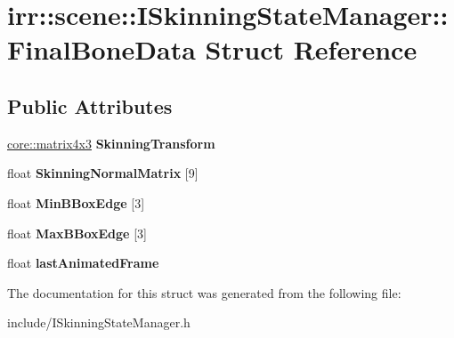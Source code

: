\hypertarget{structirr_1_1scene_1_1ISkinningStateManager_1_1FinalBoneData}{}\section{irr\+:\+:scene\+:\+:I\+Skinning\+State\+Manager\+:\+:Final\+Bone\+Data Struct Reference}
\label{structirr_1_1scene_1_1ISkinningStateManager_1_1FinalBoneData}
\subsection*{Public Attributes}
\begin{DoxyCompactItemize}
\item 
\hyperlink{classirr_1_1core_1_1matrix4x3}{core\+::matrix4x3} {\bfseries Skinning\+Transform}\hypertarget{structirr_1_1scene_1_1ISkinningStateManager_1_1FinalBoneData_ad493000655ab6bc43a97825e666d11ad}{}\label{structirr_1_1scene_1_1ISkinningStateManager_1_1FinalBoneData_ad493000655ab6bc43a97825e666d11ad}

\item 
float {\bfseries Skinning\+Normal\+Matrix} \mbox{[}9\mbox{]}\hypertarget{structirr_1_1scene_1_1ISkinningStateManager_1_1FinalBoneData_ad6ad6f692d4f9883398fbba355725b8d}{}\label{structirr_1_1scene_1_1ISkinningStateManager_1_1FinalBoneData_ad6ad6f692d4f9883398fbba355725b8d}

\item 
float {\bfseries Min\+B\+Box\+Edge} \mbox{[}3\mbox{]}\hypertarget{structirr_1_1scene_1_1ISkinningStateManager_1_1FinalBoneData_aa39f2e1b874f112421c8e225a523a8fc}{}\label{structirr_1_1scene_1_1ISkinningStateManager_1_1FinalBoneData_aa39f2e1b874f112421c8e225a523a8fc}

\item 
float {\bfseries Max\+B\+Box\+Edge} \mbox{[}3\mbox{]}\hypertarget{structirr_1_1scene_1_1ISkinningStateManager_1_1FinalBoneData_a3a91f2739d3bac6b80cac09bd4a2a2ee}{}\label{structirr_1_1scene_1_1ISkinningStateManager_1_1FinalBoneData_a3a91f2739d3bac6b80cac09bd4a2a2ee}

\item 
float {\bfseries last\+Animated\+Frame}\hypertarget{structirr_1_1scene_1_1ISkinningStateManager_1_1FinalBoneData_a7d3ae1278661643b3747d79925c782ec}{}\label{structirr_1_1scene_1_1ISkinningStateManager_1_1FinalBoneData_a7d3ae1278661643b3747d79925c782ec}

\end{DoxyCompactItemize}


The documentation for this struct was generated from the following file\+:\begin{DoxyCompactItemize}
\item 
include/I\+Skinning\+State\+Manager.\+h\end{DoxyCompactItemize}
